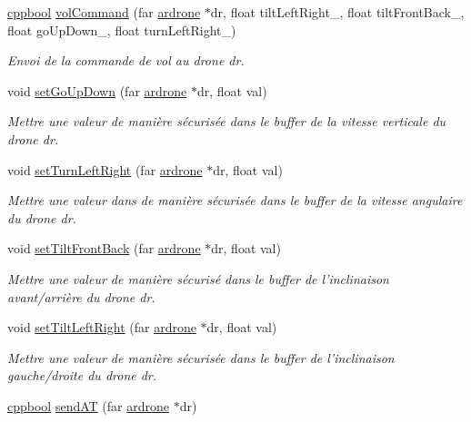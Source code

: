 \begin{DoxyCompactItemize}
\hyperlink{group___a_t_commands_ga58b930fb43c5cd2fc89a84647e6fe51c}{cppbool} \hyperlink{group___a_t_commands_gafba5305bd996ecb4332a17cf68e79928}{vol\-Command} (far \hyperlink{structardrone}{ardrone} $\ast$dr, float tilt\-Left\-Right\-\_\-, float tilt\-Front\-Back\-\_\-, float go\-Up\-Down\-\_\-, float turn\-Left\-Right\-\_\-)
\begin{DoxyCompactList}\small\item\em Envoi de la commande de vol au drone dr. \end{DoxyCompactList}\item 
void \hyperlink{group___a_t_commands_ga9d9aece95d737ed64ba8e9131ff0065c}{set\-Go\-Up\-Down} (far \hyperlink{structardrone}{ardrone} $\ast$dr, float val)
\begin{DoxyCompactList}\small\item\em Mettre une valeur de manière sécurisée dans le buffer de la vitesse verticale du drone dr. \end{DoxyCompactList}\item 
void \hyperlink{group___a_t_commands_ga0d757863caf7f9c4110ab6e71cac1a4c}{set\-Turn\-Left\-Right} (far \hyperlink{structardrone}{ardrone} $\ast$dr, float val)
\begin{DoxyCompactList}\small\item\em Mettre une valeur dans de manière sécurisée dans le buffer de la vitesse angulaire du drone dr. \end{DoxyCompactList}\item 
void \hyperlink{group___a_t_commands_ga9a290eee046f983fc53d282c0bc53aff}{set\-Tilt\-Front\-Back} (far \hyperlink{structardrone}{ardrone} $\ast$dr, float val)
\begin{DoxyCompactList}\small\item\em Mettre une valeur de manière sécurisé dans le buffer de l'inclinaison avant/arrière du drone dr. \end{DoxyCompactList}\item 
void \hyperlink{group___a_t_commands_ga28a6f7458f7dbcdf7068b26236f10e2c}{set\-Tilt\-Left\-Right} (far \hyperlink{structardrone}{ardrone} $\ast$dr, float val)
\begin{DoxyCompactList}\small\item\em Mettre une valeur de manière sécurisée dans le buffer de l'inclinaison gauche/droite du drone dr. \end{DoxyCompactList}\item 
\hyperlink{group___a_t_commands_ga58b930fb43c5cd2fc89a84647e6fe51c}{cppbool} \hyperlink{group___a_t_commands_gad4a88a78f2b094bcce69b749a845e11c}{send\-A\-T} (far \hyperlink{structardrone}{ardrone} $\ast$dr)

\end{DoxyCompactItemize}

